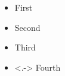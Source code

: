 \documentclass{ltx-talk}
\begin{document}
\begin{frame}
  \begin{itemize}[<+->]
    \item First
    \item Second
    \item Third
    \item<.-> Fourth
  \end{itemize}
\end{frame}
\end{document}
